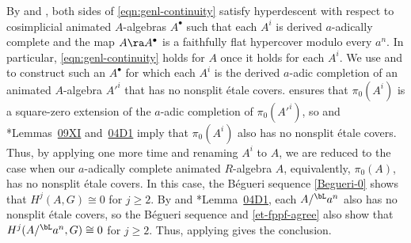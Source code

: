 By  and , both sides of \eqref{eqn:genl-continuity} satisfy hyperdescent with respect to cosimplicial animated $A$-algebras $A^\bullet$ such that each $A^i$ is derived $a$-adically complete and the map $A \ra A^\bullet$ is a faithfully flat hypercover modulo every $a^n$. In particular, \eqref{eqn:genl-continuity} holds for $A$ once it holds for each $A^i$. We use  and  to construct such an $A^\bullet$ for which each $A^i$ is the derived $a$-adic completion of an animated $A$-algebra $A'^i$ that has no nonsplit \'{e}tale covers.  ensures that $\pi_0(A^i)$ is a square-zero extension of the $a$-adic completion of $\pi_0(A'^i)$, so  and \cite{SP}*{Lemmas~\href{https://stacks.math.columbia.edu/tag/09XI}{09XI} and~\href{https://stacks.math.columbia.edu/tag/04D1}{04D1}} imply that $\pi_0(A^i)$ also has no nonsplit \'{e}tale covers. Thus, by applying  one more time and renaming $A^i$ to $A$, we are reduced to the case when our $a$-adically complete animated $R$-algebra $A$, equivalently, $\pi_0(A)$, has no nonsplit \'{e}tale covers. In this case, the B\'{e}gueri sequence \eqref{Begueri-0} shows that $H^{j}(A, G) \cong 0$ for $j \ge 2$. By  and \cite{SP}*{Lemma~\href{https://stacks.math.columbia.edu/tag/04D1}{04D1}}, each $A/^\bL a^n$ also has no nonsplit \'{e}tale covers, so the B\'{e}gueri sequence and \eqref{et-fppf-agree} also show that $H^{j}(A/^\bL a^n, G) \cong 0$ for $j \ge 2$. Thus, applying  gives the conclusion.
\epf



